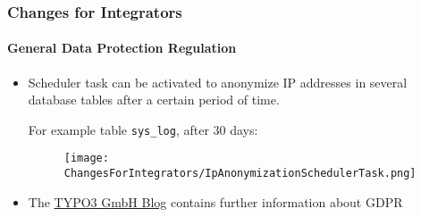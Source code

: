 
\begin{frame}[fragile]
	\frametitle{Changes for Integrators}
	\framesubtitle{General Data Protection Regulation}

	\begin{itemize}
		\item Scheduler task can be activated to anonymize IP addresses in
			several database tables after a certain period of time.\newline

			For example table \texttt{sys\_log}, after 30 days:
			\begin{figure}
				\texttt{[image: ChangesForIntegrators/IpAnonymizationSchedulerTask.png]}
			\end{figure}

		\item The \href{https://typo3.com/blog/tag/gdpr/}{TYPO3 GmbH Blog}
			contains further information about GDPR
	\end{itemize}

\end{frame}


